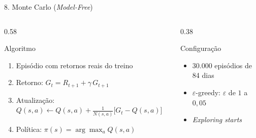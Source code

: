 \documentclass[aspectratio=169,10pt,t]{beamer}
\newenvironment{altura}[2][c]{\begin{minipage}[t][#2][#1]{\linewidth}}{\end{minipage}}
\begin{document}

\begin{frame}{8. Monte Carlo (\textit{Model-Free})}

  \begin{columns}[T,onlytextwidth]
    \begin{column}{0.58\textwidth}
      \begin{block}{Algoritmo}
        \begin{altura}{2.25cm}
        \small
        \begin{enumerate}\setlength{\itemsep}{3pt}
          \item Episódio com retornos reais do treino
          \item Retorno: $G_t = R_{t+1} + \gamma\, G_{t+1}$
          \item Atualização: $Q(s,a) \leftarrow Q(s,a) + \tfrac{1}{N(s,a)}\big[G_t - Q(s,a)\big]$
          \item Política: $\pi(s) = \arg\max_a Q(s,a)$
        \end{enumerate}
        \end{altura}
      \end{block}
    \end{column}

    \begin{column}{0.38\textwidth}
      \begin{block}{Configuração}
        \begin{altura}{2.25cm}
        \small
        \begin{itemize}\setlength{\itemsep}{3pt}
          \item 30.000 episódios de 84 dias
          \item $\varepsilon$-greedy: $\varepsilon$ de $1$ a $0{,}05$
          \item \textit{Exploring starts}
        \end{itemize}
        \end{altura}
      \end{block}
    \end{column}
  \end{columns}

  \vskip 0.2cm


\end{frame}
\end{document}

